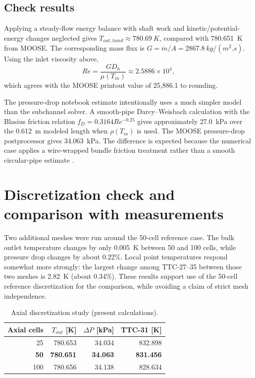 \documentclass[10pt,a4paper]{article}
\begin{document}
\subsection{Check results}
Applying a steady-flow energy balance with shaft work and kinetic/potential-energy changes neglected gives $T_{out,hand}\approx\SI{780.69}{K}$, compared with \SI{780.651}{K} from MOOSE. The corresponding mass flux is $G=\dot m/A=\SI{2867.8}{kg/(m^2.s)}$. Using the inlet viscosity above,
\begin{equation}
Re=\frac{GD_h}{\mu(T_{in})}\approx2.5886\times10^4,
\end{equation}
which agrees with the MOOSE printout value of 25,886.1 to rounding.

The pressure-drop notebook estimate intentionally uses a much simpler model than the subchannel solver. A smooth-pipe Darcy--Weisbach calculation with the Blasius friction relation $f_D=0.3164Re^{-0.25}$ \parencite{blasius1913} gives approximately \SI{27.0}{kPa} over the \SI{0.612}{m} modeled length when $\rho(T_m)$ is used. The MOOSE pressure-drop postprocessor gives \SI{34.063}{kPa}. The difference is expected because the numerical case applies a wire-wrapped bundle friction treatment rather than a smooth circular-pipe estimate \parencite{moose_ebrii}.

\section{Discretization check and comparison with measurements}

Two additional meshes were run around the 50-cell reference case. The bulk outlet temperature changes by only \SI{0.005}{K} between 50 and 100 cells, while pressure drop changes by about 0.22\%. Local point temperatures respond somewhat more strongly: the largest change among TTC-27--35 between those two meshes is \SI{2.82}{K} (about 0.34\%). These results support use of the 50-cell reference discretization for the comparison, while avoiding a claim of strict mesh independence.

\begin{table}[H]
\centering\small
\caption{Axial discretization study (present calculations).}
\begin{tabular}{@{}rrrr@{}}
\toprule
Axial cells & $T_{out}$ [K] & $\Delta P$ [kPa] & TTC-31 [K] \\
\midrule
25  & 780.653 & 34.034 & 832.898 \\
\textbf{50}  & \textbf{780.651} & \textbf{34.063} & \textbf{831.456} \\
100 & 780.656 & 34.138 & 828.634 \\
\bottomrule
\end{tabular}
\end{table}
\end{document}
